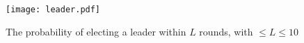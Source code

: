    \begin{figure}[h]
      \centering
      \texttt{[image: leader.pdf]}	
      \caption{The probability of electing a leader within $L$ rounds, with $\leq L \leq 10$}
      \label{leader-res}
      \end{figure}
\begin{comment}
\subsection{Problems}
\label{sec:problems}
While testing our choreographic language, we noticed that some of the case studies presented in the 
PRISM documentation \cite{PRISMdoc} cannot be modeled by using our language.
The reasons are various, in this section we try to outline the problems.

\begin{itemize}
\item \textbf{Asynchronous Leader Election}\footnote{\url{https://www.prismmodelchecker.org/casestudies/asynchronous_leader.php}}:
 processes synchronize with the same label but the conditions are different.
 We include in our language the \texttt{it-then-else} statement but we do not allow 
 the \texttt{if-then} (without the \texttt{else}). This is done because in this way, we do not 
 incur in deadlock states.
\item  \textbf{Probabilistic Broadcast Protocols}\footnote{\url{https://www.prismmodelchecker.org/casestudies/prob_broadcast.php}}:
 also in this case, the problem are the labels of the synchronizations.
 In fact, all the processes synchornize with the same label on every actions.
 This is not possible in our language, since a label is unique for every synchronization between two (or more) processes.
\item \textbf{Cyclic Server Polling System}\footnote{\url{https://www.prismmodelchecker.org/casestudies/polling.php}}:
 in this model, the processes \texttt{station$_i$} do two different things in the same state.
 More precicely, at the state 0 (\texttt{s$_i$=0}), the processes may synchornize with the process
 \texttt{server} or may change their state without any synchronization.
 In out language, this cannot be formalized since the synchronization is a branch action,
 so there should be another option with a synchronization.


\end{itemize}
\end{comment}


